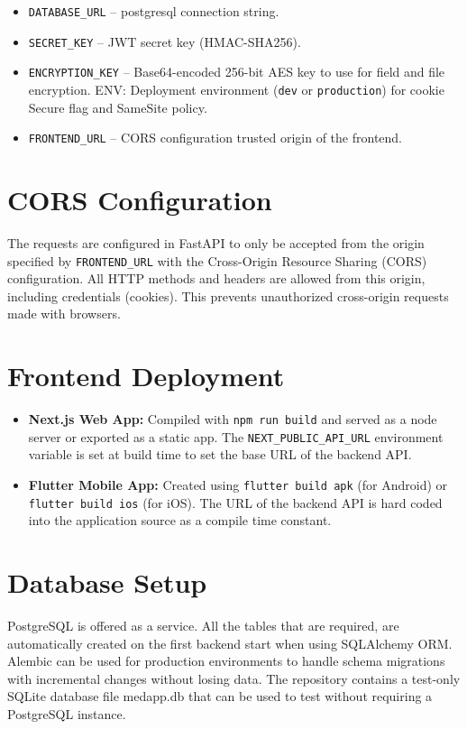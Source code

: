 \documentclass[a4paper,12pt]{report}
\begin{document}
\begin{itemize}
    \item \texttt{DATABASE\_URL} -- postgresql connection string.
    \item \texttt{SECRET\_KEY} -- JWT secret key (HMAC-SHA256).
    \item \texttt{ENCRYPTION\_KEY} -- Base64-encoded 256-bit AES key to use for field and file encryption.
    ENV: Deployment environment (\texttt{dev} or \texttt{production}) for cookie Secure flag and SameSite policy.
    \item \texttt{FRONTEND\_URL} -- CORS configuration trusted origin of the frontend.
\end{itemize}

\section{CORS Configuration}

The requests are configured in FastAPI to only be accepted from the origin specified by \texttt{FRONTEND\_URL} with the Cross-Origin Resource Sharing (CORS) configuration. All HTTP methods and headers are allowed from this origin, including credentials (cookies). This prevents unauthorized cross-origin requests made with browsers.

\section{Frontend Deployment}

\begin{itemize}
    \item \textbf{Next.js Web App:} Compiled with \texttt{npm run build} and served as a node server or exported as a static app. The \texttt{NEXT\_PUBLIC\_API\_URL} environment variable is set at build time to set the base URL of the backend API.
    \item \textbf{Flutter Mobile App:} Created using \texttt{flutter build apk} (for Android) or \texttt{flutter build ios} (for iOS). The URL of the backend API is hard coded into the application source as a compile time constant.
\end{itemize}

\section{Database Setup}

PostgreSQL is offered as a service. All the tables that are required, are automatically created on the first backend start when using SQLAlchemy ORM. Alembic can be used for production environments to handle schema migrations with incremental changes without losing data. The repository contains a test-only SQLite database file medapp.db that can be used to test without requiring a PostgreSQL instance.
\end{document}
